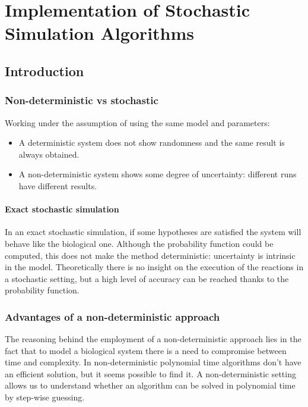 \graphicspath{{chapters/03/images/}}
\chapter{Implementation of Stochastic Simulation Algorithms}

\section{Introduction}

  \subsection{Non-deterministic vs stochastic}
  Working under the assumption of using the same model and parameters:

  \begin{multicols}{2}
    \begin{itemize}
      \item A deterministic system does not show randomness and the same result is always obtained.
      \item A non-deterministic system shows some degree of uncertainty: different runs have different results.
    \end{itemize}
  \end{multicols}

    \subsubsection{Exact stochastic simulation}
    In an exact stochastic simulation, if some hypotheses are satisfied the system will behave like the biological one.
    Although the probability function could be computed, this does not make the method deterministic: uncertainty is intrinsic in the model.
    Theoretically there is no insight on the execution of the reactions in a stochastic setting, but a high level of accuracy can be reached thanks to the probability function.

  \subsection{Advantages of a non-deterministic approach}
  The reasoning behind the employment of a non-deterministic approach lies in the fact that to model a biological system there is a need to compromise between time and complexity.
  In non-deterministic polynomial time algorithms don't have an efficient solution, but it seems possible to find it.
  A non-deterministic setting allows us to understand whether an algorithm can be solved in polynomial time by step-wise guessing.

